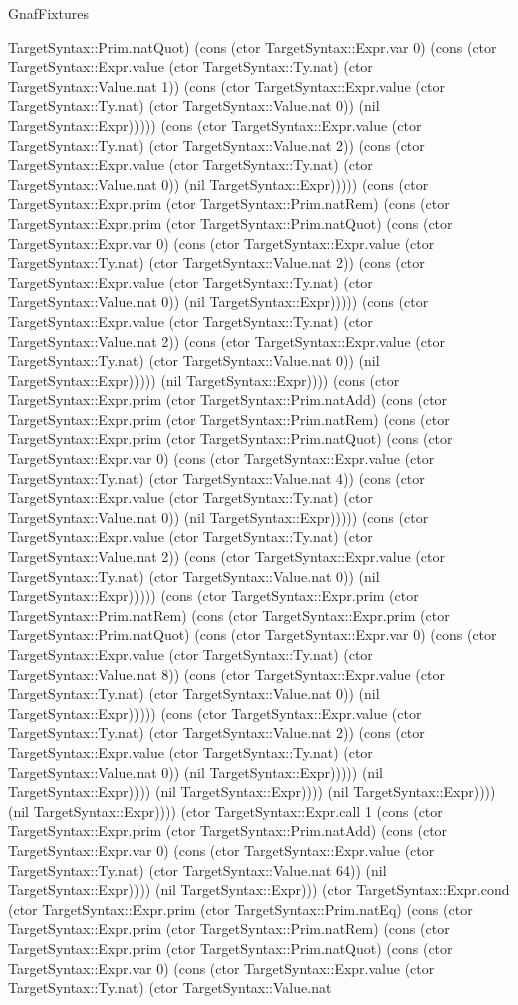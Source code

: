 \begin{lexlean}{GnafFixtures}
\begin{semanticmodule}
{TargetSyntax::Prim.natQuot) (cons (ctor TargetSyntax::Expr.var 0) (cons (ctor TargetSyntax::Expr.value (ctor TargetSyntax::Ty.nat) (ctor TargetSyntax::Value.nat 1)) (cons (ctor TargetSyntax::Expr.value (ctor TargetSyntax::Ty.nat) (ctor TargetSyntax::Value.nat 0)) (nil TargetSyntax::Expr))))) (cons (ctor TargetSyntax::Expr.value (ctor TargetSyntax::Ty.nat) (ctor TargetSyntax::Value.nat 2)) (cons (ctor TargetSyntax::Expr.value (ctor TargetSyntax::Ty.nat) (ctor TargetSyntax::Value.nat 0)) (nil TargetSyntax::Expr))))) (cons (ctor TargetSyntax::Expr.prim (ctor TargetSyntax::Prim.natRem) (cons (ctor TargetSyntax::Expr.prim (ctor TargetSyntax::Prim.natQuot) (cons (ctor TargetSyntax::Expr.var 0) (cons (ctor TargetSyntax::Expr.value (ctor TargetSyntax::Ty.nat) (ctor TargetSyntax::Value.nat 2)) (cons (ctor TargetSyntax::Expr.value (ctor TargetSyntax::Ty.nat) (ctor TargetSyntax::Value.nat 0)) (nil TargetSyntax::Expr))))) (cons (ctor TargetSyntax::Expr.value (ctor TargetSyntax::Ty.nat) (ctor TargetSyntax::Value.nat 2)) (cons (ctor TargetSyntax::Expr.value (ctor TargetSyntax::Ty.nat) (ctor TargetSyntax::Value.nat 0)) (nil TargetSyntax::Expr))))) (nil TargetSyntax::Expr)))) (cons (ctor TargetSyntax::Expr.prim (ctor TargetSyntax::Prim.natAdd) (cons (ctor TargetSyntax::Expr.prim (ctor TargetSyntax::Prim.natRem) (cons (ctor TargetSyntax::Expr.prim (ctor TargetSyntax::Prim.natQuot) (cons (ctor TargetSyntax::Expr.var 0) (cons (ctor TargetSyntax::Expr.value (ctor TargetSyntax::Ty.nat) (ctor TargetSyntax::Value.nat 4)) (cons (ctor TargetSyntax::Expr.value (ctor TargetSyntax::Ty.nat) (ctor TargetSyntax::Value.nat 0)) (nil TargetSyntax::Expr))))) (cons (ctor TargetSyntax::Expr.value (ctor TargetSyntax::Ty.nat) (ctor TargetSyntax::Value.nat 2)) (cons (ctor TargetSyntax::Expr.value (ctor TargetSyntax::Ty.nat) (ctor TargetSyntax::Value.nat 0)) (nil TargetSyntax::Expr))))) (cons (ctor TargetSyntax::Expr.prim (ctor TargetSyntax::Prim.natRem) (cons (ctor TargetSyntax::Expr.prim (ctor TargetSyntax::Prim.natQuot) (cons (ctor TargetSyntax::Expr.var 0) (cons (ctor TargetSyntax::Expr.value (ctor TargetSyntax::Ty.nat) (ctor TargetSyntax::Value.nat 8)) (cons (ctor TargetSyntax::Expr.value (ctor TargetSyntax::Ty.nat) (ctor TargetSyntax::Value.nat 0)) (nil TargetSyntax::Expr))))) (cons (ctor TargetSyntax::Expr.value (ctor TargetSyntax::Ty.nat) (ctor TargetSyntax::Value.nat 2)) (cons (ctor TargetSyntax::Expr.value (ctor TargetSyntax::Ty.nat) (ctor TargetSyntax::Value.nat 0)) (nil TargetSyntax::Expr))))) (nil TargetSyntax::Expr)))) (nil TargetSyntax::Expr)))) (nil TargetSyntax::Expr)))) (nil TargetSyntax::Expr)))) (ctor TargetSyntax::Expr.call 1 (cons (ctor TargetSyntax::Expr.prim (ctor TargetSyntax::Prim.natAdd) (cons (ctor TargetSyntax::Expr.var 0) (cons (ctor TargetSyntax::Expr.value (ctor TargetSyntax::Ty.nat) (ctor TargetSyntax::Value.nat 64)) (nil TargetSyntax::Expr)))) (nil TargetSyntax::Expr))) (ctor TargetSyntax::Expr.cond (ctor TargetSyntax::Expr.prim (ctor TargetSyntax::Prim.natEq) (cons (ctor TargetSyntax::Expr.prim (ctor TargetSyntax::Prim.natRem) (cons (ctor TargetSyntax::Expr.prim (ctor TargetSyntax::Prim.natQuot) (cons (ctor TargetSyntax::Expr.var 0) (cons (ctor TargetSyntax::Expr.value (ctor TargetSyntax::Ty.nat) (ctor TargetSyntax::Value.nat }
\end{semanticmodule}
\end{lexlean}
